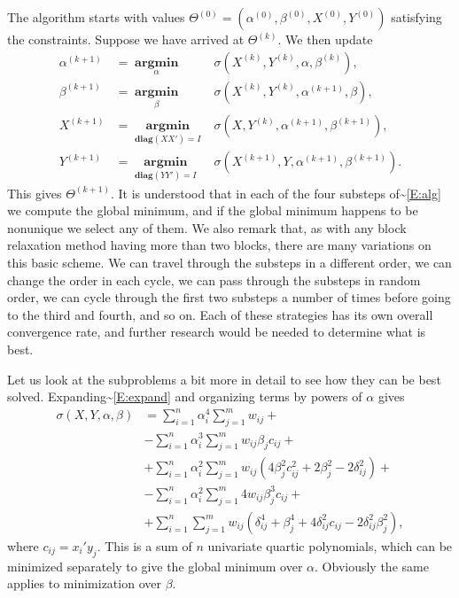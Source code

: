 \documentclass[
  12pt,
]{book}
\begin{document}
The algorithm starts with values \(\Theta^{(0)}=(\alpha^{(0)},\beta^{(0)},X^{(0)},Y^{(0)})\) satisfying the
constraints. Suppose we have arrived at \(\Theta^{(k)}\). We then update
\begin{eqnarray}
\alpha^{(k+1)}&=\mathop{\mathbf{argmin}}\limits_{\alpha}&\sigma(X^{(k)},Y^{(k)},\alpha,\beta^{(k)}),\\
\beta^{(k+1)}&=\mathop{\mathbf{argmin}}\limits_{\beta}&\sigma(X^{(k)},Y^{(k)},\alpha^{(k+1)},\beta),\\
X^{(k+1)}&=\mathop{\mathbf{argmin}}\limits_{\mathbf{diag}(XX')=I}&\sigma(X,Y^{(k)},\alpha^{(k+1)},\beta^{(k+1)}),\\
Y^{(k+1)}&=\mathop{\mathbf{argmin}}\limits_{\mathbf{diag}(YY')=I}&\sigma(X^{(k+1)},Y,\alpha^{(k+1)},\beta^{(k+1)}).
\end{eqnarray}
This gives \(\Theta^{(k+1)}\). It is understood that in each of the four substeps of\textasciitilde{}\eqref{E:alg}
we compute the global minimum, and if the global minimum happens to be nonunique we
select any of them. We also remark that, as with any block relaxation method having more
than two blocks, there are many variations on this basic scheme. We can travel through
the substeps in a different order, we can change the order in each cycle, we can pass
through the substeps in random order, we can cycle through the first two substeps a number
of times before going to the third and fourth, and so on. Each of these strategies has its
own overall convergence rate, and further research would be needed to determine what is best.

Let us look at the subproblems a bit more in detail to see how they can be best solved.
Expanding\textasciitilde{}\eqref{E:expand} and organizing terms by powers of \(\alpha\) gives
\begin{align*}
\sigma(X,Y,\alpha,\beta)&=\sum_{i=1}^{n}\alpha_{i}^{4}\sum_{j=1}^{m}w_{ij}+\\
&-\sum_{i=1}^{n}\alpha_{i}^{3}\sum_{j=1}^{m}w_{ij}\beta_{j}c_{ij}+\\
&+\sum_{i=1}^{n}\alpha_{i}^{2}\sum_{j=1}^{m}w_{ij}(4\beta_{j}^{2}c_{ij}^{2}+2\beta_{j}^{2}-2\delta_{ij}^{2})+\\
&-\sum_{i=1}^{n}\alpha_{i}^{2}\sum_{j=1}^{m}4w_{ij}\beta_{j}^{3}c_{ij}+\\
&+\sum_{i=1}^{n}\sum_{j=1}^{m}w_{ij}(\delta_{ij}^{4}+\beta_{j}^{4}+4\delta_{ij}^{2}c_{ij}-2\delta_{ij}^{2}\beta_{j}^{2}),
\end{align*}
where \(c_{ij}=x_{i}'y_{j}^{}\). This is a sum of \(n\) univariate quartic polynomials, which
can be minimized separately to give the global minimum over \(\alpha\). Obviously the
same applies to minimization over \(\beta\).
\end{document}
